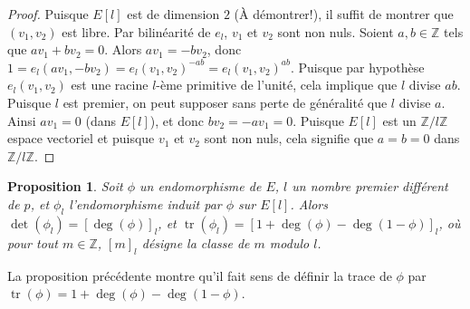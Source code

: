 \documentclass{article}
\theoremstyle{plain}%
\newtheorem{prop}[thm]{Proposition}
\theoremstyle{definition}%
\newcommand{\Z}{\mathbb{Z}}
\DeclareMathOperator{\tr}{tr}
\begin{document}
\begin{proof}
  Puisque $E[l]$ est de dimension $2$ {\color{red} (À démontrer!)}, il suffit de montrer que $(v_1, v_2)$ est libre. Par bilinéarité de $e_l$, $v_1$ et $v_2$ sont non nuls. Soient $a, b\in\Z$ tels que $av_1 + bv_2 = 0$. Alors $av_1 = -bv_2$, donc $1 = e_l(av_1, -bv_2) = e_l(v_1, v_2)^{-ab} = e_l(v_1, v_2)^{ab}$. Puisque par hypothèse $e_l(v_1, v_2)$ est une racine $l$-ème primitive de l'unité, cela implique que $l$ divise $ab$. Puisque $l$ est premier, on peut supposer sans perte de généralité que $l$ divise $a$. Ainsi $av_1 = 0$ (dans $E[l]$), et donc $bv_2=-av_1=0$. Puisque $E[l]$ est un $\Z/l\Z$ espace vectoriel et puisque $v_1$ et $v_2$ sont non nuls, cela signifie que $a=b=0$ dans $\Z/l\Z$.
\end{proof}

\begin{prop}
  \label{dettr}
  Soit $\phi$ un endomorphisme de $E$, $l$ un nombre premier différent de $p$, et $\phi_l$ l'endomorphisme induit par $\phi$ sur $E[l]$. Alors $\det(\phi_l) = [\deg(\phi)]_l$, et $\tr(\phi_l) = [1 + \deg(\phi) - \deg(1-\phi)]_l$, où pour tout $m\in\Z$, $[m]_l$ désigne la classe de $m$ modulo $l$. 
\end{prop}

La proposition précédente montre qu'il fait sens de définir la trace de $\phi$ par $\tr(\phi) = 1 + \deg(\phi) - \deg(1-\phi)$.
\end{document}
